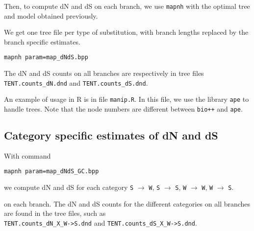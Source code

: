 \documentclass[11pt, a4paper]{article}
\begin{document}
Then, to compute dN and dS on each branch, we use \texttt{mapnh} with
the optimal tree and model obtained previously.

We get one tree file per type of substitution, with branch lengths
replaced by the branch specific estimates.

\begin{verbatim}
mapnh param=map_dNdS.bpp
\end{verbatim}

The dN and dS counts on all branches are respectively in tree files
\\ 
\verb|TENT.counts_dN.dnd| and
\verb|TENT.counts_dS.dnd|.

\smallskip

An example of usage in R is in file \texttt{manip.R}. In this file, we
use the library \texttt{ape} to handle trees. Note that the node
numbers are different between \texttt{bio++} and \texttt{ape}.

\subsection*{Category specific estimates of dN and dS}

With command

\begin{verbatim}
mapnh param=map_dNdS_GC.bpp
\end{verbatim}

we compute dN and dS for each category \texttt{S} $
\rightarrow $ \texttt{W}, \texttt{S} $
\rightarrow $ \texttt{S}, \texttt{W} $
\rightarrow $ \texttt{W}, \texttt{W} $
\rightarrow $ \texttt{S}.

on each branch. The dN and dS counts for the different categories on
all branches are found in the tree files, such as
\\ \verb|TENT.counts_dN_X_W->S.dnd| and
\verb|TENT.counts_dS_X_W->S.dnd|.
\end{document}
